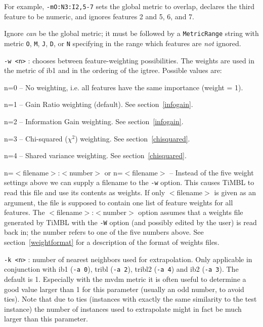 \documentclass{report}
\begin{document}
\begin{description}
For example, {\tt -mO:N3:I2,5-7} sets the global metric to overlap,
declares the third feature to be numeric, and ignores features 2 and
5, 6, and 7.

Ignore {\em can}\/ be the global metric; it must be followed by a {\tt MetricRange} string with metric {\tt O}, {\tt M}, {\tt J}, {\tt D}, or {\tt N} specifying in the range which features are {\em not}\/ ignored.

\item {\tt -w <n>} : chooses between feature-weighting possibilities.
The weights are used in the metric of {\sc ib1} and in the ordering of the
{\sc igtree}. Possible values are:

	\begin{description}
	\item n=0 -- No weighting, i.e. all features have the same
	importance (weight = 1).
	\item n=1 -- Gain Ratio weighting (default). See section~\ref{infogain}.
	\item n=2 -- Information Gain weighting. See section~\ref{infogain}.
	\item n=3 -- Chi-squared ($\chi^2$) weighting. See section~\ref{chisquared}.
	\item n=4 -- Shared variance weighting. See section~\ref{chisquared}.
	\item n=$<$filename$>$:$<$number$>$ or n=$<$filename$>$ --
          Instead of the five weight settings above we can supply a
          filename to the {\tt -w} option. This causes TiMBL to read
          this file and use its contents as weights. If only
          $<$filename$>$ is given as an argument, the file is supposed
          to contain one list of feature weights for all features. The
          $<$filename$>$:$<$number$>$ option assumes that a weights
          file generated by TiMBL with the {\tt -W} option (and
          possibly edited by the user) is read back in; the number
          refers to one of the five numbers above. See
          section~\ref{weightformat} for a description of the format
          of weights files.
	\end{description}

\item {\tt -k <n>} : number of nearest neighbors used for
        extrapolation. Only applicable in conjunction with {\sc ib1}
        ({\tt -a 0}), {\sc tribl} ({\tt -a 2}), {\sc tribl2} ({\tt -a
          4}) and {\sc ib2} ({\tt -a 3}). The default is 1. Especially
        with the {\sc mvdm} metric it is often useful to determine a
        good value larger than 1 for this parameter (usually an odd
        number, to avoid ties). Note that due to ties (instances with
        exactly the same similarity to the test instance) the number
        of instances used to extrapolate might in fact be much larger
        than this parameter.


\end{description}
\end{document}
